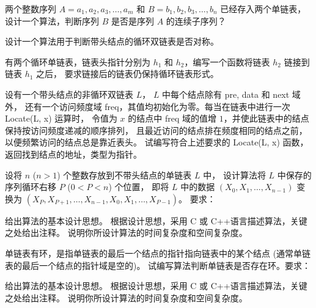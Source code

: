 \begin{qitems}
    \begin{bbox}
        \qitem 两个整数序列 $A=a_1, a_2, a_3, \dots, a_m$ 和 $B=b_1, b_2, b_3, \dots, b_n$ 已经存入两个单链表，设计一个算法，判断序列 $B$ 是否是序列 $A$ 的连续子序列？
    \end{bbox}

    \begin{bbox}
        \qitem 设计一个算法用于判断带头结点的循环双链表是否对称。
    \end{bbox}

    \begin{bbox}
        \qitem 有两个循环单链表，链表头指针分别为 $h_1$ 和 $h_2$，编写一个函数将链表 $h_2$ 链接到链表 $h_1$ 之后，
        要求链接后的链表仍保持循环链表形式。
    \end{bbox}

    \begin{bbox}
        \qitem 设有一个带头结点的非循环双链表 $L$， $L$ 中每个结点除有 pre, data 和 next 域外，
        还有一个访问频度域 freq，其值均初始化为零。每当在链表中进行一次 Locate(L, x) 运算时，
        令值为 $x$ 的结点中 freq 域的值增 $1$，并使此链表中的结点保持按访问频度递减的顺序排列，
        且最近访问的结点排在频度相同的结点之前，以便频繁访问的结点总是靠近表头。
        试编写符合上述要求的 Locate(L, x) 函数，返回找到结点的地址，类型为指针。
    \end{bbox}

    \begin{bbox}
        \qitem 设将 $n$ ($n>1$) 个整数存放到不带头结点的单链表 $L$ 中，
        设计算法将 $L$ 中保存的序列循环右移 $P$ ($0<P<n$) 个位置，
        即将 $L$ 中的数据 $(X_0, X_1, \dots, X_{n-1})$ 变换为 $(X_P, X_{P+1}, \dots, X_{n-1}, X_0, X_1, \dots, X_{P-1})$。
        要求：
        \begin{subqitems}
            \subqitem 给出算法的基本设计思想。
            \subqitem 根据设计思想，采用 C 或 C++语言描述算法，关键之处给出注释。
            \subqitem 说明你所设计算法的时间复杂度和空间复杂度。
        \end{subqitems}
    \end{bbox}

    \begin{bbox}
        \qitem 单链表有环，是指单链表的最后一个结点的指针指向链表中的某个结点 (通常单链表的最后一个结点的指针域是空的)。
        试编写算法判断单链表是否存在环。要求：
        \begin{subqitems}
            \subqitem 给出算法的基本设计思想。
            \subqitem 根据设计思想，采用 C 或 C++语言描述算法，关键之处给出注释。
            \subqitem 说明你所设计算法的时间复杂度和空间复杂度。
        \end{subqitems}
    \end{bbox}


\end{qitems}
